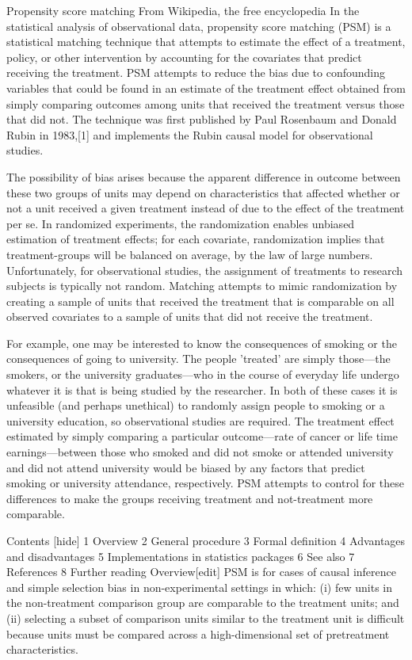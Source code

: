Propensity score matching
From Wikipedia, the free encyclopedia
In the statistical analysis of observational data, propensity score matching (PSM) is a statistical matching technique that attempts to estimate the effect of a treatment, policy, or other intervention by accounting for the covariates that predict receiving the treatment. PSM attempts to reduce the bias due to confounding variables that could be found in an estimate of the treatment effect obtained from simply comparing outcomes among units that received the treatment versus those that did not. The technique was first published by Paul Rosenbaum and Donald Rubin in 1983,[1] and implements the Rubin causal model for observational studies.

The possibility of bias arises because the apparent difference in outcome between these two groups of units may depend on characteristics that affected whether or not a unit received a given treatment instead of due to the effect of the treatment per se. In randomized experiments, the randomization enables unbiased estimation of treatment effects; for each covariate, randomization implies that treatment-groups will be balanced on average, by the law of large numbers. Unfortunately, for observational studies, the assignment of treatments to research subjects is typically not random. Matching attempts to mimic randomization by creating a sample of units that received the treatment that is comparable on all observed covariates to a sample of units that did not receive the treatment.

For example, one may be interested to know the consequences of smoking or the consequences of going to university. The people 'treated' are simply those—the smokers, or the university graduates—who in the course of everyday life undergo whatever it is that is being studied by the researcher. In both of these cases it is unfeasible (and perhaps unethical) to randomly assign people to smoking or a university education, so observational studies are required. The treatment effect estimated by simply comparing a particular outcome—rate of cancer or life time earnings—between those who smoked and did not smoke or attended university and did not attend university would be biased by any factors that predict smoking or university attendance, respectively. PSM attempts to control for these differences to make the groups receiving treatment and not-treatment more comparable.

Contents  [hide] 
1	Overview
2	General procedure
3	Formal definition
4	Advantages and disadvantages
5	Implementations in statistics packages
6	See also
7	References
8	Further reading
Overview[edit]
PSM is for cases of causal inference and simple selection bias in non-experimental settings in which: (i) few units in the non-treatment comparison group are comparable to the treatment units; and (ii) selecting a subset of comparison units similar to the treatment unit is difficult because units must be compared across a high-dimensional set of pretreatment characteristics.

